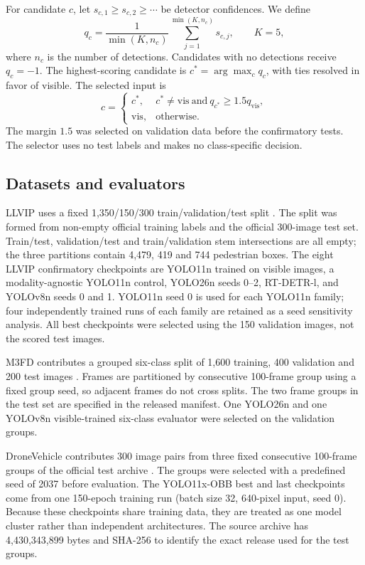 \documentclass[preprint,11pt]{elsarticle}
\begin{document}
For candidate \(c\), let
\(s_{c,1}\ge s_{c,2}\ge\cdots\) be detector confidences. We define
\begin{equation}
q_c=\frac{1}{\min(K,n_c)}
\sum_{j=1}^{\min(K,n_c)}s_{c,j},
\qquad K=5,
\end{equation}
where \(n_c\) is the number of detections. Candidates with no detections receive
\(q_c=-1\). The highest-scoring candidate is
\(c^\ast=\arg\max_c q_c\), with ties resolved in favor of visible. The selected
input is
\begin{equation}
c=
\begin{cases}
c^\ast, & c^\ast\ne\mathrm{vis}\ \text{and}\ q_{c^\ast}\ge1.5q_{\mathrm{vis}},\\
\mathrm{vis}, & \text{otherwise}.
\end{cases}
\end{equation}
The margin \(1.5\) was selected on validation data before the confirmatory
tests. The selector uses no test labels and makes no class-specific decision.

\subsection{Datasets and evaluators}

LLVIP uses a fixed 1,350/150/300 train/validation/test split
\cite{jia2021}. The split was formed from non-empty official training labels
and the official 300-image test set. Train/test, validation/test and
train/validation stem intersections are all empty; the three partitions
contain 4,479, 419 and 744 pedestrian boxes. The eight LLVIP confirmatory
checkpoints are YOLO11n trained on visible images, a modality-agnostic YOLO11n
control, YOLO26n seeds 0--2, RT-DETR-l, and YOLOv8n seeds 0 and 1. YOLO11n
seed 0 is used for each YOLO11n family; four independently trained runs of each
family are retained as a seed sensitivity analysis. All best checkpoints were
selected using the 150 validation images, not the scored test images.

M3FD contributes a grouped six-class split of 1,600 training, 400 validation
and 200 test images \cite{liu2022}. Frames are partitioned by consecutive
100-frame group using a fixed group seed, so adjacent frames do not cross
splits. The two frame groups in the test set are specified in the released
manifest. One YOLO26n and one YOLOv8n visible-trained six-class evaluator were
selected on the validation groups.

DroneVehicle contributes 300 image pairs from three fixed consecutive
100-frame groups of the official test archive \cite{sun2022}. The groups were
selected with a predefined seed of 2037 before evaluation. The YOLO11x-OBB
best and last checkpoints come from one 150-epoch training run (batch size 32,
640-pixel input, seed 0). Because these checkpoints share training data, they
are treated as one model cluster rather than independent architectures. The
source archive has 4,430,343,899 bytes and SHA-256
\texttt{}
to identify the exact release used for the test groups.
\end{document}
